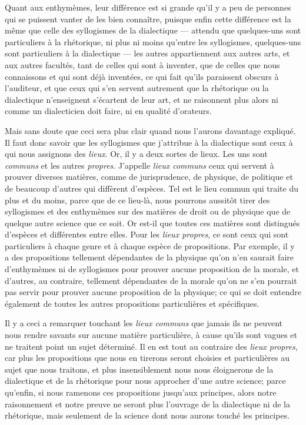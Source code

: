 Quant aux enthymèmes, leur différence est si grande qu'il y a peu de personnes qui se puissent vanter de les bien connaître, puisque enfin cette
différence est la même que celle des syllogismes de la dialectique --- attendu que quelques-uns sont particuliers à la rhétorique, ni plus ni moins
qu'entre les syllogismes, quelques-uns sont particuliers à la dialectique --- les autres appartiennent aux autres arts, et aux autres facultés, tant
de celles qui sont à inventer, que de celles que nous connaissons et qui sont déjà inventées, ce qui fait qu'ils paraissent obscurs à l'auditeur, et
que ceux qui s'en servent autrement que la rhétorique ou la dialectique n'enseignent s'écartent de leur art, et ne raisonnent plus alors ni comme un
dialecticien doit faire, ni en qualité d'orateurs.

Mais sans doute que ceci sera plus clair quand nous l'aurons davantage expliqué. Il faut donc savoir que les syllogismes que j'attribue à la dialectique
sont ceux à qui nous assignons des \emph{lieux}. Or, il y a deux sortes de lieux. Les uns sont \emph{communs} et les autres \emph{propres}. J'appelle
\emph{lieux communs} ceux qui servent à prouver diverses matières, comme de jurisprudence, de physique, de politique et de beaucoup d'autres qui diffèrent
d'espèces. Tel est le lieu commun qui traite du plus et du moins, parce que de ce lieu-là, nous pourrons aussitôt tirer des syllogismes et des enthymèmes
sur des matières de droit ou de physique que de quelque autre science que ce soit. Or est-il que toutes ces matières sont distingués d'espèces et
différentes entre elles. Pour les \emph{lieux propres}, ce sont ceux qui sont particuliers à chaque genre et à chaque espèce de propositions. Par exemple,
il y a des propositions tellement dépendantes de la physique qu'on n'en saurait faire d'enthymèmes ni de syllogismes pour prouver aucune proposition de la
morale, et d'autres, au contraire, tellement dépendantes de la morale qu'on ne s'en pourrait pas servir pour prouver aucune proposition de la physique; ce
qui se doit entendre également de toutes les autres propositions particulières et spécifiques.

\bigbreak

Il y a ceci a remarquer touchant les \emph{lieux communs} que jamais ils ne peuvent nous rendre savants sur aucune matière particulière, à cause qu'ils
sont vagues et ne traitent point un sujet déterminé. Il en est tout au contraire des \emph{lieux propres}, car plus les propositions que nous en tirerons
seront choisies et particulières au sujet que nous traitons, et plus insensiblement nous nous éloignerons de la dialectique et de la rhétorique pour nous
approcher d'une autre science; parce qu'enfin, si nous ramenons ces propositions jusqu'aux principes, alors notre raisonnement et notre preuve ne seront
plus l'ouvrage de la dialectique ni de la rhétorique, mais seulement de la science dont nous aurons touché les principes. 

